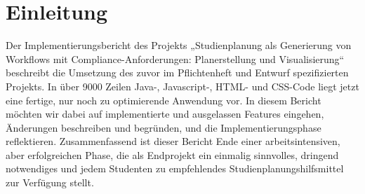 \section{Einleitung}
Der Implementierungsbericht des Projekts „Studienplanung als Generierung von Workflows mit Compliance-Anforderungen: Planerstellung und Visualisierung“ beschreibt die Umsetzung des zuvor im Pflichtenheft und Entwurf spezifizierten Projekts. In über 9000 Zeilen Java-, Javascript-, HTML- und CSS-Code liegt jetzt eine fertige, nur noch zu optimierende Anwendung vor. In diesem Bericht möchten wir dabei auf implementierte und ausgelassen Features eingehen, Änderungen beschreiben und begründen, und die Implementierungsphase  reflektieren.
Zusammenfassend ist dieser Bericht Ende einer arbeitsintensiven, aber erfolgreichen Phase, die als Endprojekt ein einmalig sinnvolles, dringend notwendiges und jedem Studenten zu empfehlendes Studienplanungshilfsmittel zur Verfügung stellt.


